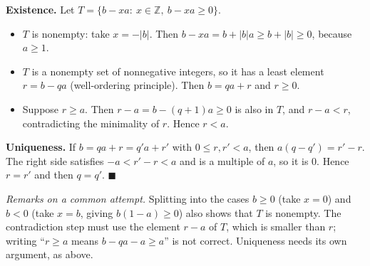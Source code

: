 \textbf{Existence.} Let $T=\{b-xa:\ x\in\mathbb Z,\ b-xa\ge0\}$.
\begin{itemize}
\item $T$ is nonempty: take $x=-|b|$. Then $b-xa=b+|b|a\ge b+|b|\ge0$, because $a\ge1$.
\item $T$ is a nonempty set of nonnegative integers, so it has a least element $r=b-qa$ (well-ordering principle). Then $b=qa+r$ and $r\ge0$.
\item Suppose $r\ge a$. Then $r-a=b-(q+1)a\ge0$ is also in $T$, and $r-a<r$, contradicting the minimality of $r$. Hence $r<a$.
\end{itemize}
\textbf{Uniqueness.} If $b=qa+r=q'a+r'$ with $0\le r,r'<a$, then $a(q-q')=r'-r$. The right side satisfies $-a<r'-r<a$ and is a multiple of $a$, so it is $0$. Hence $r=r'$ and then $q=q'$. $\blacksquare$

\emph{Remarks on a common attempt.} Splitting into the cases $b\ge0$ (take $x=0$) and $b<0$ (take $x=b$, giving $b(1-a)\ge0$) also shows that $T$ is nonempty. The contradiction step must use the element $r-a$ of $T$, which is smaller than $r$; writing ``$r\ge a$ means $b-qa-a\ge a$'' is not correct. Uniqueness needs its own argument, as above.
